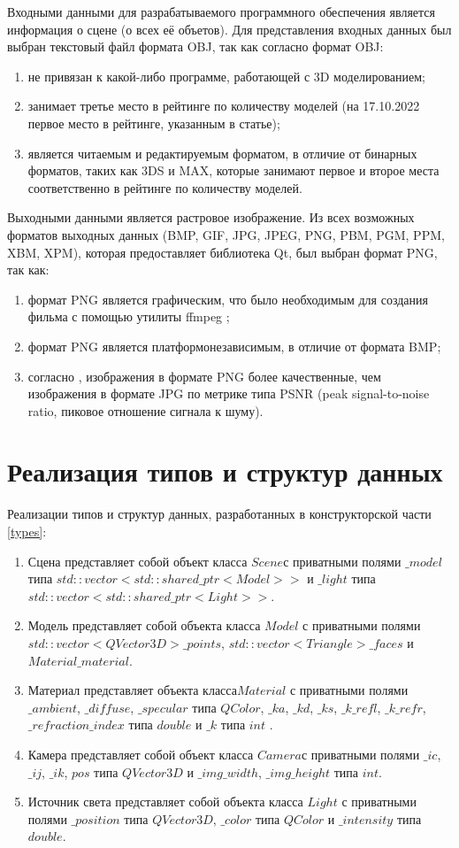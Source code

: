 Входными данными для разрабатываемого программного обеспечения является информация о сцене (о всех её объетов). Для представления входных данных был выбран текстовый файл формата OBJ, так как согласно \cite{3d} формат OBJ:
\begin{enumerate}[label=\arabic*)]
	\item не привязан к какой-либо программе, работающей с 3D моделированием;
	\item занимает третье место в рейтинге по количеству моделей (на 17.10.2022 первое место в рейтинге, указанным в статье);
	\item является читаемым и редактируемым форматом, в отличие от бинарных форматов, таких как 3DS и MAX, которые занимают первое и второе места соответственно в рейтинге по количеству моделей.
\end{enumerate}

Выходными данными является растровое изображение. Из всех возможных форматов выходных данных (BMP, GIF, JPG, JPEG, PNG, PBM, PGM, PPM, XBM, XPM), которая предоставляет библиотека Qt, был выбран формат PNG, так как:
\begin{enumerate}[label=\arabic*)]
	\item формат PNG является графическим, что было необходимым для создания фильма с помощью утилиты ffmpeg \cite{ffmpeg};
	\item формат PNG является платформонезависимым, в отличие от формата BMP;
	\item согласно \cite{jpgvspng}, изображения в формате PNG более качественные, чем изображения в формате JPG по метрике типа PSNR (peak signal-to-noise ratio, пиковое отношение сигнала к шуму).
\end{enumerate}

\section{Реализация типов и структур данных}
Реализации типов и структур данных, разработанных в конструкторской части \ref{types}:
\begin{enumerate}[label=\arabic*)]
	\item  Сцена представляет собой объект класса $Scene $с приватными полями $\_model$ типа $std::vector<std::shared\_ptr<Model>>$ и $\_light$ типа $std::vector<std::shared\_ptr<Light>>$.
	\item  Модель представляет собой объекта класса $Model$ с приватными полями
	$std::vector<QVector3D> \_points$, $std::vector<Triangle> \_faces$ и $Material \_material$.
	\item Материал представляет объекта класса$Material$ с приватными полями $\_ambient$, $\_diffuse$, $\_specular$ типа $QColor$, $\_ka$, $\_kd$, $\_ks$, $\_k\_refl$, $\_k\_refr$, $\_refraction\_index$ типа $double$ и $\_k$ типа $int$ .
	\item Камера представляет собой объект класса $Camera $с приватными полями $\_ic$, $\_ij$, $\_ik$, $pos$ типа $QVector3D$ и $\_img\_width$, $\_img\_height$ типа $int$.
	\item Источник света представляет собой объекта класса $Light$ с приватными полями $\_position$ типа $QVector3D$, $\_color$ типа $QColor$ и $\_intensity$ типа $double$. 
\end{enumerate}

